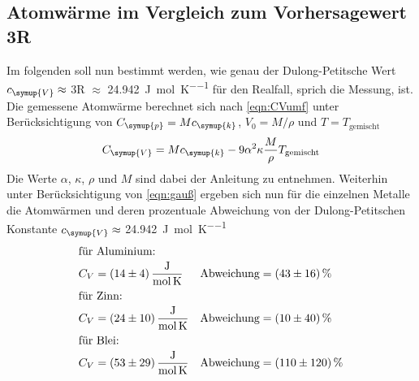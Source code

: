 \subsection{Atomwärme im Vergleich zum Vorhersagewert 3R}
Im folgenden soll nun bestimmt werden, wie genau der Dulong-Petitsche
Wert $c_\symup{V}\approx$ 3R $\approx$ \SI{24,942}{\joule\per\mol\per\kelvin}
für den Realfall, sprich die Messung, ist. Die gemessene Atomwärme
berechnet sich nach \eqref{eqn:CVumf} unter Berücksichtigung von
$C_\symup{p}=Mc_\symup{k}$, $V_0 = M/\rho$ und $T=T_\text{gemischt}$
\begin{equation}
  C_\symup{V}=Mc_\symup{k}-9\alpha^2\kappa\frac{M}{\rho}T_\text{gemischt}
  \label{eqn:CV}
\end{equation}
Die Werte $\alpha$, $\kappa$, $\rho$ und $M$ sind dabei der
Anleitung zu entnehmen. Weiterhin unter Berücksichtigung von \eqref{eqn:gauß}
ergeben sich nun für die einzelnen Metalle die Atomwärmen und deren
prozentuale Abweichung von der Dulong-Petitschen Konstante
$c_\symup{V}\approx$ \SI{24,942}{\joule\per\mol\per\kelvin}
\begin{align*}
  \intertext{für Aluminium:}
  C_V&=\SI{14(4)}{\joule\per\mol\per\kelvin}&
  \text{Abweichung}&=\SI{43(16)}{\percent}\\
  \intertext{für Zinn:}
  C_V&=\SI{24(10)}{\joule\per\mol\per\kelvin}&
  \text{Abweichung}&=\SI{10(40)}{\percent}\\
  \intertext{für Blei:}
  C_V&=\SI{53(29)}{\joule\per\mol\per\kelvin}&
  \text{Abweichung}&=\SI{110(120)}{\percent}
\end{align*}
